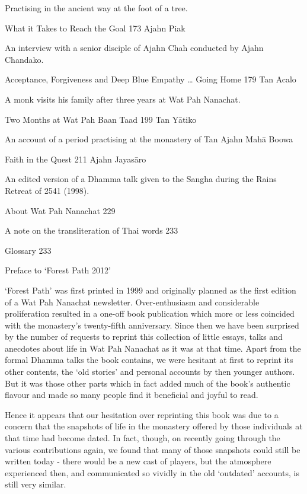 Practising in the ancient way at the foot of a tree.

What it Takes to Reach the Goal 173 Ajahn Piak

An interview with a senior disciple of Ajahn Chah conducted by Ajahn
Chandako.

Acceptance, Forgiveness and Deep Blue Empathy \ldots{} Going Home 179
Tan Acalo

A monk visits his family after three years at Wat Pah Nanachat.

Two Months at Wat Pah Baan Taad 199 Tan Yātiko

An account of a period practising at the monastery of Tan Ajahn Mahā
Boowa

Faith in the Quest 211 Ajahn Jayasāro

An edited version of a Dhamma talk given to the Sangha during the Rains
Retreat of 2541 (1998).

About Wat Pah Nanachat 229

A note on the transliteration of Thai words 233

Glossary 233



Preface to `Forest Path 2012'

`Forest Path' was first printed in 1999 and originally planned as the
first edition of a Wat Pah Nanachat newsletter. Over-enthusiasm and
considerable proliferation resulted in a one-off book publication which
more or less coincided with the monastery's twenty-fifth anniversary.
Since then we have been surprised by the number of requests to reprint
this collection of little essays, talks and anecdotes about life in Wat
Pah Nanachat as it was at that time. Apart from the formal Dhamma talks
the book contains, we were hesitant at first to reprint its other
contents, the `old stories' and personal accounts by then younger
authors. But it was those other parts which in fact added much of the
book's authentic flavour and made so many people find it beneficial and
joyful to read.

Hence it appears that our hesitation over reprinting this book was due
to a concern that the snapshots of life in the monastery offered by
those individuals at that time had become dated. In fact, though, on
recently going through the various contributions again, we found that
many of those snapshots could still be written today - there would be a
new cast of players, but the atmosphere experienced then, and
communicated so vividly in the old `outdated' accounts, is still very
similar.

